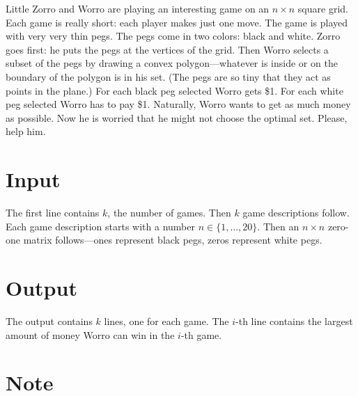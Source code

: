 
Little Zorro and Worro are playing an interesting game on an
$n\times n$ square grid. Each game is really short: each player makes just one move.
The game is played with very very thin
pegs. The pegs come in two colors: black and white. Zorro goes
first: he puts the pegs at the vertices of the grid. Then Worro
selects a subset of the pegs by drawing a convex
polygon---whatever is inside or on the boundary of the polygon is
in his set. (The pegs are so tiny that they act as points in the plane.)
For each black peg selected Worro gets \$1. For each
white peg selected Worro has to pay \$1. Naturally, Worro wants to
get as much money as possible. Now he is worried that he might not
choose the optimal set. Please, help him.

\section*{Input}
The first line contains $k$, the number of games. Then $k$ game
descriptions follow. Each game description starts with a number
$n\in\{1,\dots,20\}$. Then an $n\times n$ zero-one matrix
follows---ones represent black pegs, zeros represent white pegs.

\section*{Output}
The output contains $k$ lines, one for each game. The $i$-th line
contains the largest amount of money Worro can win in the $i$-th
game.

\section*{Note}

